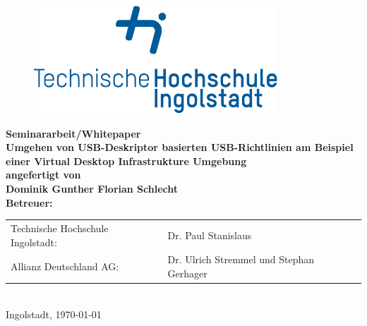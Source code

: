 
\begin{titlepage}

\phantom{tmpText}

\vspace{1cm}

\begin{figure}[h!]
\centering
\includegraphics[width=\textwidth]{bilder/thi_logo_cropped.pdf}
\end{figure}

  \begin{center}

    
    
    \textbf{{\large Seminararbeit/Whitepaper} \\[3ex]
    {\LARGE Umgehen von USB-Deskriptor basierten USB-Richtlinien am Beispiel einer Virtual Desktop Infrastrukture Umgebung} \\[1ex]
    \vfill
    angefertigt von \\
    Dominik Gunther Florian Schlecht \\[2ex] %
    \vfill
    Betreuer:} \\%
    \begin{tabular}{ll}
      Technische Hochschule Ingolstadt: & Dr. Paul Stanislaus \\
      Allianz Deutschland AG: & Dr. Ulrich Stremmel und Stephan Gerhager
    \end{tabular} \\[2ex]
    \vfill
    Ingolstadt, \today
  \end{center}
\end{titlepage}

